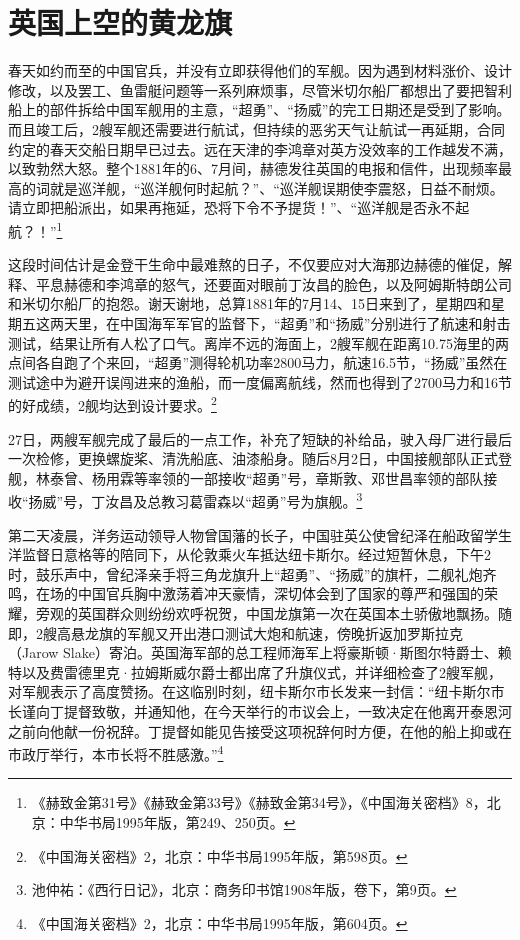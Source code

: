 \documentclass[12pt,UTF8]{ctexbook}
\begin{document}
\section{英国上空的黄龙旗}

春天如约而至的中国官兵，并没有立即获得他们的军舰。因为遇到材料涨价、设计修改，以及罢工、鱼雷艇问题等一系列麻烦事，尽管米切尔船厂都想出了要把智利船上的部件拆给中国军舰用的主意，“超勇”、“扬威”的完工日期还是受到了影响。而且竣工后，2艘军舰还需要进行航试，但持续的恶劣天气让航试一再延期，合同约定的春天交船日期早已过去。远在天津的李鸿章对英方没效率的工作越发不满，以致勃然大怒。整个1881年的6、7月间，赫德发往英国的电报和信件，出现频率最高的词就是巡洋舰，“巡洋舰何时起航？”、“巡洋舰误期使李震怒，日益不耐烦。请立即把船派出，如果再拖延，恐将下令不予提货！”、“巡洋舰是否永不起航？！”\footnote{《赫致金第31号》《赫致金第33号》《赫致金第34号》，《中国海关密档》8，北京：中华书局1995年版，第249、250页。}

这段时间估计是金登干生命中最难熬的日子，不仅要应对大海那边赫德的催促，解释、平息赫德和李鸿章的怒气，还要面对眼前丁汝昌的脸色，以及阿姆斯特朗公司和米切尔船厂的抱怨。谢天谢地，总算1881年的7月14、15日来到了，星期四和星期五这两天里，在中国海军军官的监督下，“超勇”和“扬威”分别进行了航速和射击测试，结果让所有人松了口气。离岸不远的海面上，2艘军舰在距离10.75海里的两点间各自跑了个来回，“超勇”测得轮机功率2800马力，航速16.5节，“扬威”虽然在测试途中为避开误闯进来的渔船，而一度偏离航线，然而也得到了2700马力和16节的好成绩，2舰均达到设计要求。\footnote{《中国海关密档》2，北京：中华书局1995年版，第598页。}

27日，两艘军舰完成了最后的一点工作，补充了短缺的补给品，驶入母厂进行最后一次检修，更换螺旋桨、清洗船底、油漆船身。随后8月2日，中国接舰部队正式登舰，林泰曾、杨用霖等率领的一部接收“超勇”号，章斯敦、邓世昌率领的部队接收“扬威”号，丁汝昌及总教习葛雷森以“超勇”号为旗舰。\footnote{池仲祐：《西行日记》，北京：商务印书馆1908年版，卷下，第9页。}

第二天凌晨，洋务运动领导人物曾国藩的长子，中国驻英公使曾纪泽在船政留学生洋监督日意格等的陪同下，从伦敦乘火车抵达纽卡斯尔。经过短暂休息，下午2时，鼓乐声中，曾纪泽亲手将三角龙旗升上“超勇”、“扬威”的旗杆，二舰礼炮齐鸣，在场的中国官兵胸中激荡着冲天豪情，深切体会到了国家的尊严和强国的荣耀，旁观的英国群众则纷纷欢呼祝贺，中国龙旗第一次在英国本土骄傲地飘扬。随即，2艘高悬龙旗的军舰又开出港口测试大炮和航速，傍晚折返加罗斯拉克（Jarow Slake）寄泊。英国海军部的总工程师海军上将豪斯顿·斯图尔特爵士、赖特以及费雷德里克·拉姆斯威尔爵士都出席了升旗仪式，并详细检查了2艘军舰，对军舰表示了高度赞扬。在这临别时刻，纽卡斯尔市长发来一封信：“纽卡斯尔市长谨向丁提督致敬，并通知他，在今天举行的市议会上，一致决定在他离开泰恩河之前向他献一份祝辞。丁提督如能见告接受这项祝辞何时方便，在他的船上抑或在市政厅举行，本市长将不胜感激。”\footnote{《中国海关密档》2，北京：中华书局1995年版，第604页。}
\end{document}
